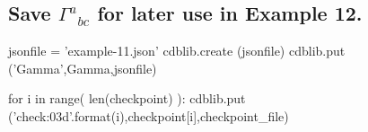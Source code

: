 \documentclass[12pt]{cdblatex}
\begin{document}
\clearpage


\subsection*{Save $\Gamma^{a}{}_{bc}$ for later use in Example 12.}

\begin{cadabra}
   jsonfile = 'example-11.json'
   cdblib.create (jsonfile)
   cdblib.put ('Gamma',Gamma,jsonfile)
\end{cadabra}

\bgroup
{}
\begin{cadabra}
   for i in range( len(checkpoint) ):
      cdblib.put ('check{:03d}'.format(i),checkpoint[i],checkpoint_file)
\end{cadabra}
\egroup
\end{document}

